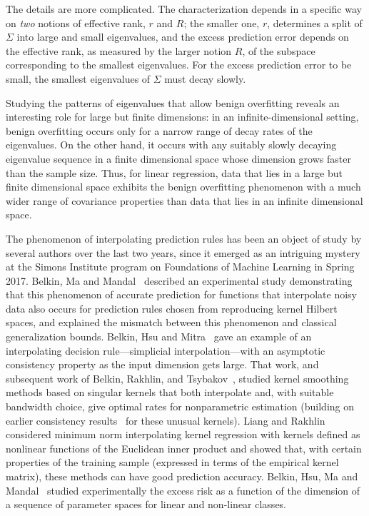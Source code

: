 \documentclass[11pt,notitlepage]{article}
\begin{document}
The details are more complicated. The characterization
depends in a specific way on {\em two} notions of effective rank,
$r$ and $R$; the smaller one, $r$, determines a split of $\Sigma$
into large and small eigenvalues, and the excess prediction error
depends on the effective rank, as measured by the larger notion $R$, of
the subspace corresponding to the smallest eigenvalues. For the excess
prediction error to be small, the smallest eigenvalues of $\Sigma$
must decay slowly.

Studying the patterns of eigenvalues that allow benign overfitting
reveals an interesting role for large but finite dimensions: in an
infinite-dimensional setting, benign overfitting occurs only for a
narrow range of decay rates of the eigenvalues. On the other
hand, it occurs with any suitably slowly decaying eigenvalue sequence
in a finite dimensional space whose dimension grows
faster than the sample size. Thus, for linear regression,
data that lies in a large but finite dimensional space exhibits the
benign overfitting phenomenon with a much wider range of covariance
properties than data that lies in an infinite dimensional space.

The phenomenon of interpolating prediction rules has been an
object of study by several authors over the last two years, since
it emerged as an intriguing mystery at the Simons Institute program
on Foundations of Machine Learning in Spring 2017.  Belkin, Ma and
Mandal~\cite{pmlr-v80-belkin18a} 
described an experimental study
demonstrating that this phenomenon of accurate prediction for
functions that interpolate noisy data also occurs for prediction
rules chosen from reproducing kernel Hilbert spaces, and explained
the mismatch between this phenomenon and classical generalization
bounds.  Belkin, Hsu and Mitra~\cite{bhm-opfrbcrri-18} gave
an example of an interpolating decision rule---simplicial
interpolation---with an asymptotic consistency property as the input dimension
gets large. That work, and subsequent work of Belkin, Rakhlin, and
Tsybakov~\cite{brt-ddicso-18}, studied
kernel smoothing methods based on singular kernels that
both interpolate and, with suitable bandwidth choice, give optimal
rates for nonparametric estimation (building on earlier consistency
results~\cite{dgk-hkre-98} for these unusual kernels).  Liang and
Rakhlin~\cite{lr-jikrrcg-18} considered minimum norm interpolating
kernel regression with kernels defined as nonlinear functions of the
Euclidean inner product and showed that, with certain properties
of the training sample (expressed in terms of the empirical kernel
matrix), these methods can have good prediction accuracy.
Belkin, Hsu, Ma and Mandal~\cite{bhmm-rmmlbvt-18} studied
experimentally the excess risk as a function of the dimension of a
sequence of parameter spaces for linear and non-linear classes.
\end{document}
